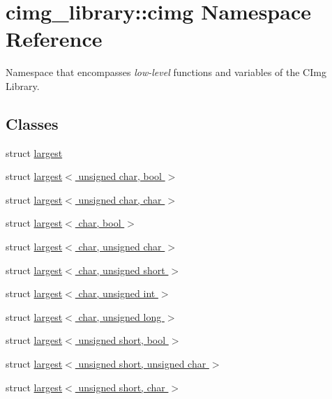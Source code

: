 \hypertarget{namespacecimg__library_1_1cimg}{
\section{cimg\_\-library::cimg Namespace Reference}
\label{namespacecimg__library_1_1cimg}
}


Namespace that encompasses {\itshape low-\/level\/} functions and variables of the CImg Library.  


\subsection*{Classes}
\begin{DoxyCompactItemize}
\item 
struct \hyperlink{structcimg__library_1_1cimg_1_1largest}{largest}
\item 
struct \hyperlink{structcimg__library_1_1cimg_1_1largest_3_01unsigned_01char_00_01bool_01_4}{largest$<$ unsigned char, bool $>$}
\item 
struct \hyperlink{structcimg__library_1_1cimg_1_1largest_3_01unsigned_01char_00_01char_01_4}{largest$<$ unsigned char, char $>$}
\item 
struct \hyperlink{structcimg__library_1_1cimg_1_1largest_3_01char_00_01bool_01_4}{largest$<$ char, bool $>$}
\item 
struct \hyperlink{structcimg__library_1_1cimg_1_1largest_3_01char_00_01unsigned_01char_01_4}{largest$<$ char, unsigned char $>$}
\item 
struct \hyperlink{structcimg__library_1_1cimg_1_1largest_3_01char_00_01unsigned_01short_01_4}{largest$<$ char, unsigned short $>$}
\item 
struct \hyperlink{structcimg__library_1_1cimg_1_1largest_3_01char_00_01unsigned_01int_01_4}{largest$<$ char, unsigned int $>$}
\item 
struct \hyperlink{structcimg__library_1_1cimg_1_1largest_3_01char_00_01unsigned_01long_01_4}{largest$<$ char, unsigned long $>$}
\item 
struct \hyperlink{structcimg__library_1_1cimg_1_1largest_3_01unsigned_01short_00_01bool_01_4}{largest$<$ unsigned short, bool $>$}
\item 
struct \hyperlink{structcimg__library_1_1cimg_1_1largest_3_01unsigned_01short_00_01unsigned_01char_01_4}{largest$<$ unsigned short, unsigned char $>$}
\item 
struct \hyperlink{structcimg__library_1_1cimg_1_1largest_3_01unsigned_01short_00_01char_01_4}{largest$<$ unsigned short, char $>$}

\end{DoxyCompactItemize}
